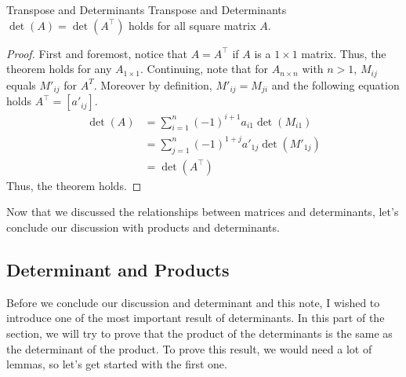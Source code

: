 \documentclass[../main.tex]{subfiles}
\begin{document}
\begin{theorem}{Transpose and Determinants}
{Transpose and Determinants}
$\det(A) = \det(A^\intercal)$ holds for all square matrix $A$.
\end{theorem}
\begin{proof}
First and foremost, notice that $A = A^\intercal$ if $A$ is a
$1 \times 1$ matrix. Thus, the theorem holds for any $A_{1 \times 1}$.
Continuing, note that for $A_{n \times n}$ with $n > 1$, $M_{ij}$
equals $M'_{ij}$ for $A^T$. Moreover by definition, $M'_{ij} =
M_{ji}$ and the following equation holds $A^\intercal = [a'_{ij}]$.
\begin{align*}
    \det(A)
    &= \sum_{i=1}^n (-1)^{i + 1} a_{i1} \det(M_{i1}) \\
    &= \sum_{j=1}^n (-1)^{1 + j} a'_{1j} \det(M'_{1j}) \\
    &= \det\left( A^\intercal \right)
\end{align*}
Thus, the theorem holds.
\end{proof}

Now that we discussed the relationships between matrices and
determinants, let's conclude our discussion with products and
determinants.

\subsection{Determinant and Products}

Before we conclude our discussion and determinant and this note,
I wished to introduce one of the most important result of
determinants. In this part of the section, we will try to prove
that the product of the determinants is the same as the determinant
of the product. To prove this result, we would need a lot of lemmas,
so let's get started with the first one.
\end{document}
